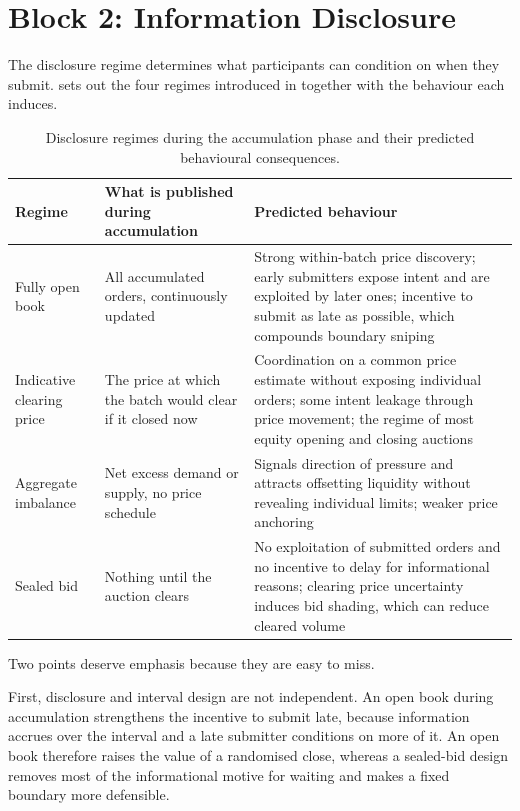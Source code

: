 \section{Block 2: Information Disclosure}
\label{sec:disclosure}

The disclosure regime determines what participants can condition on when
they submit.  sets out the four regimes introduced
in  together with the behaviour each induces.

\begin{table}[htbp]
\centering
\caption[Disclosure regimes and induced behaviour]{Disclosure regimes
during the accumulation phase and their predicted behavioural
consequences.}
\label{tab:disclosure}
\small
\begin{tabularx}{\textwidth}{@{}p{2.9cm} L L@{}}
\toprule
\textbf{Regime} & \textbf{What is published during accumulation} &
\textbf{Predicted behaviour}\\
\midrule
Fully open book & All accumulated orders, continuously updated &
Strong within-batch price discovery; early submitters expose intent and
are exploited by later ones; incentive to submit as late as possible,
which compounds boundary sniping\\
Indicative clearing price & The price at which the batch would clear if
it closed now & Coordination on a common price estimate without exposing
individual orders; some intent leakage through price movement; the
regime of most equity opening and closing auctions\\
Aggregate imbalance & Net excess demand or supply, no price schedule &
Signals direction of pressure and attracts offsetting liquidity without
revealing individual limits; weaker price anchoring\\
Sealed bid & Nothing until the auction clears & No exploitation of
submitted orders and no incentive to delay for informational reasons;
clearing price uncertainty induces bid shading, which can reduce cleared
volume\\
\bottomrule
\end{tabularx}
\end{table}

Two points deserve emphasis because they are easy to miss.

First, disclosure and interval design are not independent. An open book
during accumulation strengthens the incentive to submit late, because
information accrues over the interval and a late submitter conditions on
more of it. An open book therefore raises the value of a randomised
close, whereas a sealed-bid design removes most of the informational
motive for waiting and makes a fixed boundary more defensible.

